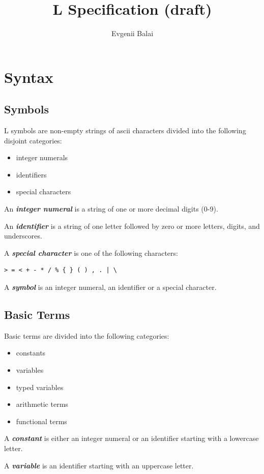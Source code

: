 \documentclass[a4paper,10pt]{article}
\title{L Specification (draft)}
\author{Evgenii Balai}
\def\st{\noindent}
\begin{document}
\maketitle
\st
\setcounter{tocdepth}{2}
\tableofcontents
\section{Syntax}
\subsection{Symbols}\label{symbols}
L symbols are non-empty strings of ascii characters divided into the following disjoint categories:
\begin{itemize}
\item integer numerals
\item identifiers
\item special characters
\end{itemize}

An \textbf{\textit{integer numeral}} is a string of one or more decimal digits (0-9).


An \textbf{\textit{identifier}} is a string of one letter followed by zero or more letters, digits, and underscores.

A \textbf{\textit{special character}} is one of the following characters:
\begin{verbatim}
> = < + - * / % { } ( ) , . | \
\end{verbatim}

A \textbf{\textit{symbol}} is an integer numeral, an identifier or a special character.
\subsection{Basic Terms}
Basic terms are divided into the following categories:
\begin{itemize}
\item constants
\item variables
\item typed variables
\item arithmetic terms
\item functional terms
\end{itemize}

A \textit{\textbf{constant}} is either an integer numeral or an identifier starting with a lowercase letter.



A \textit{\textbf{variable}} is an identifier starting with an uppercase letter. 
\end{document}
